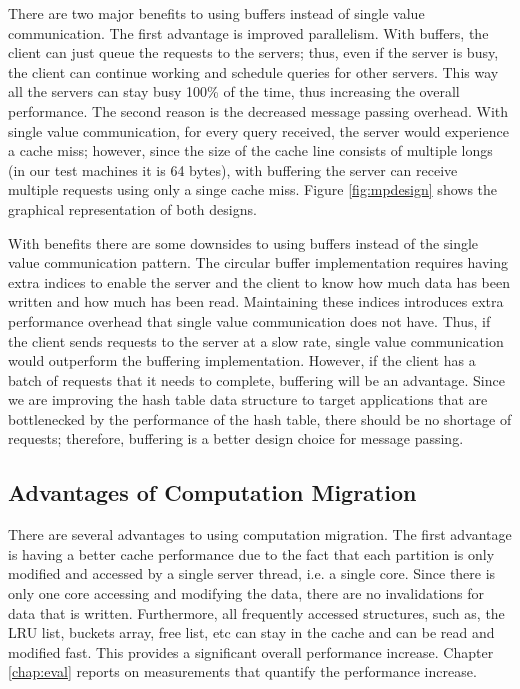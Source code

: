 There are two major benefits to using buffers instead of single value communication. The first advantage is improved parallelism. 
With buffers, the client can just queue the requests to the servers; thus, even if the server is busy, the client can continue working 
and schedule queries for other servers. This way all the servers can stay busy 100\% of the time, thus increasing the overall 
performance. The second reason is the decreased message passing overhead.  With single value communication, for every query 
received, the server would experience a cache miss; however, since the size of the cache line consists of multiple longs (in our test 
machines it is 64 bytes), with buffering the server can receive multiple requests using only a singe cache miss. Figure \ref{fig:mpdesign} 
shows the graphical representation of both designs.

With benefits there are some downsides to using buffers instead of the single value communication pattern. The circular buffer 
implementation requires having extra indices to enable the server and the client to know how much data has been written 
and how much has been read. Maintaining these indices introduces extra performance overhead that single value communication 
does not have. Thus, if the client sends requests to the server at a slow rate, single value communication would 
outperform the buffering implementation. However, if the client has a batch of requests that it needs to complete, buffering will be 
an advantage. Since we are improving the hash table data structure to target applications that are bottlenecked by 
the performance of the hash table, there should be no shortage of requests; therefore, buffering is a better design choice for 
message passing.

\subsection{Advantages of Computation Migration}
\label{sec:compmigration}

There are several advantages to using computation migration. The first advantage is having a better cache performance 
due to the fact that each partition is only modified and accessed by a single server thread, i.e. a single core. 
Since there is only one core accessing and modifying the data, there are no invalidations for data that 
is written. Furthermore, all frequently accessed structures, such as, the LRU list, buckets array, free list, etc can stay in 
the cache and can be read and modified fast. This provides a significant overall performance increase. 
Chapter \ref{chap:eval} reports on measurements that quantify the performance increase.

